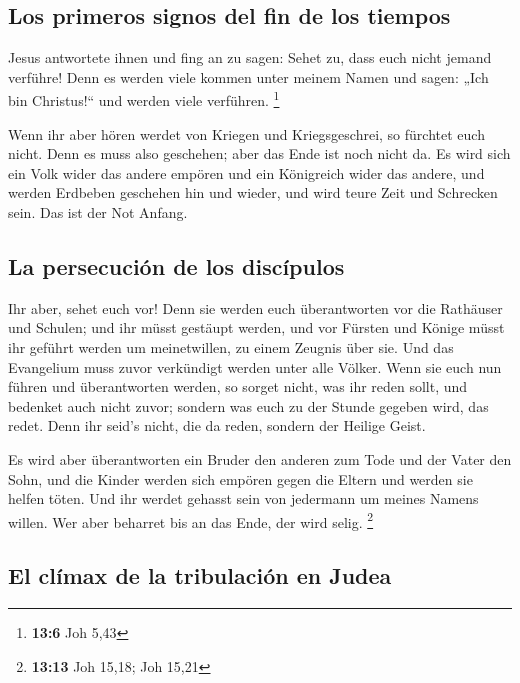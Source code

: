 \hypertarget{los-primeros-signos-del-fin-de-los-tiempos-1}{%
\subsection{Los primeros signos del fin de los
tiempos}\label{los-primeros-signos-del-fin-de-los-tiempos-1}}

 Jesus antwortete ihnen und fing an zu sagen: Sehet zu,
dass euch nicht jemand verführe!  Denn es werden viele
kommen unter meinem Namen und sagen: „Ich bin Christus!{}`` und werden
viele verführen. \footnote{\textbf{13:6} Joh 5,43}

 Wenn ihr aber hören werdet von Kriegen und
Kriegsgeschrei, so fürchtet euch nicht. Denn es muss also geschehen;
aber das Ende ist noch nicht da.  Es wird sich ein Volk
wider das andere empören und ein Königreich wider das andere, und werden
Erdbeben geschehen hin und wieder, und wird teure Zeit und Schrecken
sein. Das ist der Not Anfang.

\hypertarget{la-persecuciuxf3n-de-los-discuxedpulos}{%
\subsection{La persecución de los
discípulos}\label{la-persecuciuxf3n-de-los-discuxedpulos}}

 Ihr aber, sehet euch vor! Denn sie werden euch
überantworten vor die Rathäuser und Schulen; und ihr müsst gestäupt
werden, und vor Fürsten und Könige müsst ihr geführt werden um
meinetwillen, zu einem Zeugnis über sie.  Und das
Evangelium muss zuvor verkündigt werden unter alle Völker.
 Wenn sie euch nun führen und überantworten werden, so
sorget nicht, was ihr reden sollt, und bedenket auch nicht zuvor;
sondern was euch zu der Stunde gegeben wird, das redet. Denn ihr seid's
nicht, die da reden, sondern der Heilige Geist.

 Es wird aber überantworten ein Bruder den anderen zum
Tode und der Vater den Sohn, und die Kinder werden sich empören gegen
die Eltern und werden sie helfen töten.  Und ihr werdet
gehasst sein von jedermann um meines Namens willen. Wer aber beharret
bis an das Ende, der wird selig. \footnote{\textbf{13:13} Joh 15,18; Joh
  15,21}

\hypertarget{el-cluxedmax-de-la-tribulaciuxf3n-en-judea}{%
\subsection{El clímax de la tribulación en
Judea}\label{el-cluxedmax-de-la-tribulaciuxf3n-en-judea}}

